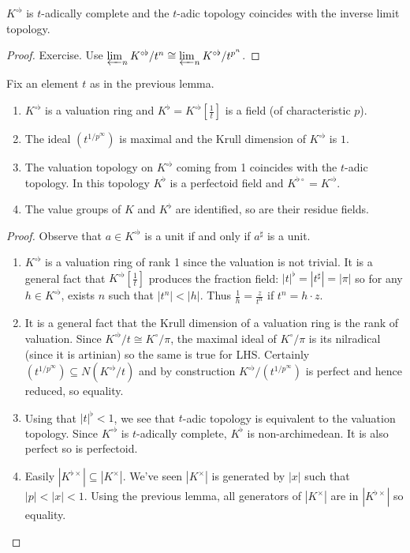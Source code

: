 \documentclass[a4paper]{article}
\newcommand{\tilt}{\flat} %
\begin{document}
\begin{corollary}
  \(K^{\circ \tilt}\) is \(t\)-adically complete and the \(t\)-adic topology coincides with the inverse limit topology.
\end{corollary}

\begin{proof}
  Exercise. Use \(\varprojlim_n K^{\circ \tilt}/t^n \cong \varprojlim_n K^{\circ \tilt}/t^{p^n}\).
\end{proof}

\begin{proposition}
  Fix an element \(t\) as in the previous lemma.
  \begin{enumerate}
  \item \(K^{\circ \tilt}\) is a valuation ring and \(K^\tilt = K^{\circ \tilt}[\frac{1}{t}]\) is a field (of characteristic \(p\)).
  \item The ideal \((t^{1/p^\infty})\) is maximal and the Krull dimension of \(K^{\circ \tilt}\) is \(1\).
  \item The valuation topology on \(K^{\circ \tilt}\) coming from 1 coincides with the \(t\)-adic topology. In this topology \(K^\tilt\) is a perfectoid field and \(K^{\tilt \circ} = K^{\circ \tilt}\).
  \item The value groups of \(K\) and \(K^\tilt\) are identified, so are their residue fields.
  \end{enumerate}
\end{proposition}

\begin{proof}
  Observe that \(a \in K^{\circ \tilt}\) is a unit if and only if \(a^\sharp\) is a unit.
  \begin{enumerate}
  \item \(K^{\circ \tilt}\) is a valuation ring of rank 1 since the valuation is not trivial. It is a general fact that \(K^{\circ \tilt}[\frac{1}{t}]\) produces the fraction field: \(|t|^\tilt = |t^\sharp| = |\pi|\) so for any \(h \in K^{\circ \tilt}\), exists \(n\) such that \(|t^n| < |h|\). Thus \(\frac{1}{h} = \frac{z}{t^n}\) if \(t^n = h \cdot z\).
  \item It is a general fact that the Krull dimension of a valuation ring is the rank of valuation. Since \(K^{\circ \tilt}/t \cong K^\circ/\pi\), the maximal ideal of \(K^\circ/\pi\) is its nilradical (since it is artinian) so the same is true for LHS. Certainly \((t^{1/p^\infty}) \subseteq N(K^{\circ \tilt}/t)\) and by construction \(K^{\circ \tilt}/(t^{1/p^\infty})\) is perfect and hence reduced, so equality.
  \item Using that \(|t|^\tilt < 1\), we see that \(t\)-adic topology is equivalent to the valuation topology. Since \(K^{\circ \tilt}\) is \(t\)-adically complete, \(K^\tilt \) is non-archimedean. It is also perfect so is perfectoid.
  \item Easily \(|K^{\tilt \times}| \subseteq |K^\times|\). We've seen \(|K^\times|\) is generated by \(|x|\) such that \(|p| < |x| < 1\). Using the previous lemma, all generators of \(|K^\times|\) are in \(|K^{\tilt \times}|\) so equality.
  \end{enumerate}
\end{proof}
\end{document}
